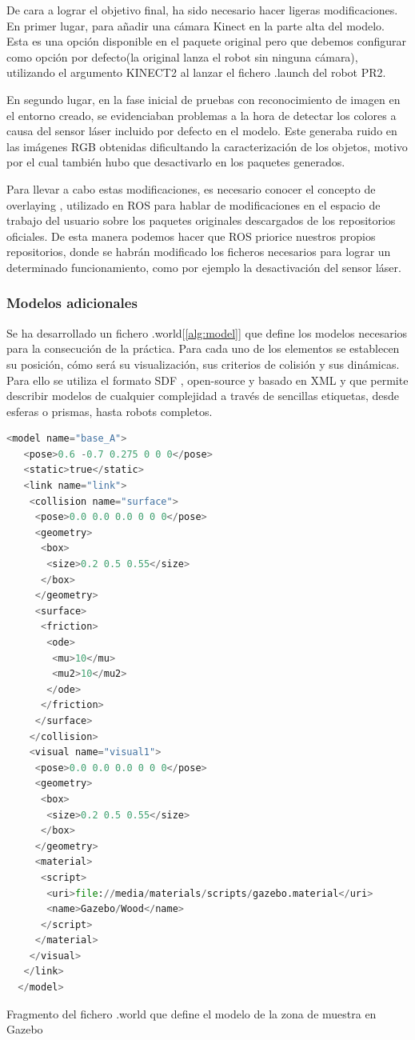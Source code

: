 \documentclass[12pt,spanish,chapterprefix, numbers=noenddot]{book}
\numberwithin{equation}{section}
\numberwithin{figure}{section}
\begin{document}
De cara a lograr el objetivo final, ha sido necesario hacer ligeras modificaciones. En primer lugar, para añadir una cámara Kinect \cite{gazebo_plugins} en la parte alta del modelo. Esta es una opción disponible en el paquete original pero que debemos configurar como opción por defecto(la original lanza el robot sin ninguna cámara), utilizando el argumento KINECT2 al lanzar el fichero .launch del robot PR2. 

En segundo lugar, en la fase inicial de pruebas con reconocimiento de imagen en el entorno creado, se evidenciaban problemas a la hora de detectar los colores a causa del sensor láser incluido por defecto en el modelo. Este generaba ruido en las imágenes RGB obtenidas dificultando la caracterización de los objetos, motivo por el cual también hubo que desactivarlo en los paquetes generados.    

Para llevar a cabo estas modificaciones, es necesario conocer el concepto de overlaying \cite{overlaying}, utilizado en ROS para hablar de modificaciones en el espacio de trabajo \cite{wstool} del usuario sobre los paquetes originales descargados de los repositorios oficiales. De esta manera podemos hacer que ROS priorice nuestros propios repositorios, donde se habrán modificado los ficheros necesarios para lograr un determinado funcionamiento, como por ejemplo la desactivación del sensor láser.

\subsubsection{Modelos adicionales}
Se ha desarrollado un fichero .world[\ref{alg:model}] que define los modelos necesarios para la consecución de la práctica. Para cada uno de los elementos se establecen su posición, cómo será su visualización, sus criterios de colisión y sus dinámicas. 
Para ello se utiliza el formato SDF \cite{sdf_format}, open-source y basado en XML y que permite describir modelos de cualquier complejidad a través de sencillas etiquetas, desde esferas o prismas, hasta robots completos.

\vspace{20pt}
\begin{algorithm}[htb!]
	\begin{lstlisting}[breaklines=true,language=python]  
  <model name="base_A">
   <pose>0.6 -0.7 0.275 0 0 0</pose>
   <static>true</static>
   <link name="link">
    <collision name="surface">
     <pose>0.0 0.0 0.0 0 0 0</pose>
     <geometry>
      <box>
       <size>0.2 0.5 0.55</size>
      </box>
     </geometry>
     <surface>
      <friction>
       <ode>
        <mu>10</mu>
        <mu2>10</mu2>
       </ode>
      </friction>
     </surface>
    </collision>
    <visual name="visual1">
     <pose>0.0 0.0 0.0 0 0 0</pose>
     <geometry>
      <box>
       <size>0.2 0.5 0.55</size>
      </box>
     </geometry>
     <material>
      <script>
       <uri>file://media/materials/scripts/gazebo.material</uri>
       <name>Gazebo/Wood</name>
      </script>
     </material>
    </visual>
   </link>
  </model>
	\end{lstlisting}
\caption{\label{alg:model}Fragmento del fichero .world que define el modelo de la zona de muestra en Gazebo}
\end{algorithm}
\end{document}
